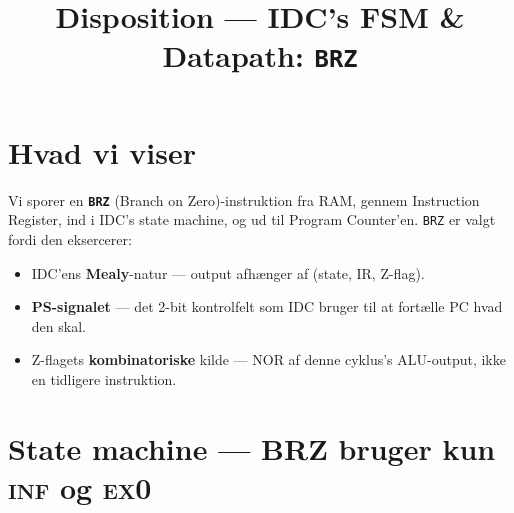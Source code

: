 \documentclass[11pt,a4paper]{article}
\title{\vspace{-1em}\textcolor{accent}{\Large Disposition --- IDC's FSM \& Datapath: \texttt{BRZ}}}
\author{}
\date{}
\begin{document}
\maketitle
\vspace{-3em}

\section*{Hvad vi viser}

Vi sporer en \textbf{\texttt{BRZ}} (Branch on Zero)-instruktion
fra RAM, gennem Instruction Register, ind i IDC's state machine,
og ud til Program Counter'en. \texttt{BRZ} er valgt fordi den eksercerer:

\begin{itemize}
  \item IDC'ens \textbf{Mealy}-natur --- output afhænger af (state, IR, Z-flag).
  \item \textbf{PS-signalet} --- det 2-bit kontrolfelt som IDC bruger til at fortælle PC hvad den skal.
  \item Z-flagets \textbf{kombinatoriske} kilde --- NOR af denne cyklus's ALU-output, ikke en tidligere instruktion.
\end{itemize}

\section*{State machine --- BRZ bruger kun \textsc{inf} og \textsc{ex0}}

\begin{center}
\end{center}
\end{document}
